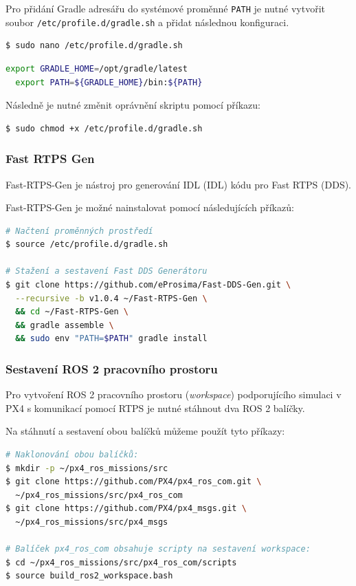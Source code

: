 Pro přidání Gradle adresářu do systémové proměnné \texttt{PATH} je nutné vytvořit soubor \texttt{/etc/profile.d/gradle.sh} a přidat následnou konfiguraci.

\begin{lstlisting}[language=bash]
$ sudo nano /etc/profile.d/gradle.sh
\end{lstlisting}

\begin{lstlisting}[language=bash]
  export GRADLE_HOME=/opt/gradle/latest
  export PATH=${GRADLE_HOME}/bin:${PATH}
\end{lstlisting}

Následně je nutné změnit oprávnění skriptu pomocí příkazu:

\begin{lstlisting}[language=bash]
$ sudo chmod +x /etc/profile.d/gradle.sh
\end{lstlisting}

\subsubsection{Fast RTPS Gen}

Fast-RTPS-Gen je nástroj pro generování \acs{IDL} (\acl{IDL}) kódu pro Fast RTPS (\acs{DDS}).

Fast-RTPS-Gen je možné nainstalovat pomocí následujících příkazů:

\begin{lstlisting}[language=bash]
# Načtení proměnných prostředí
$ source /etc/profile.d/gradle.sh

# Stažení a sestavení Fast DDS Generátoru
$ git clone https://github.com/eProsima/Fast-DDS-Gen.git \
  --recursive -b v1.0.4 ~/Fast-RTPS-Gen \
  && cd ~/Fast-RTPS-Gen \
  && gradle assemble \
  && sudo env "PATH=$PATH" gradle install
\end{lstlisting}

\subsubsection{Sestavení ROS 2 pracovního prostoru}

Pro vytvoření ROS 2 pracovního prostoru (\textit{workspace}) podporujícího simulaci v PX4 s komunikací pomocí \acs{RTPS} je nutné stáhnout dva ROS 2 balíčky. \cite{PX4docs}

Na stáhnutí a sestavení obou balíčků můžeme použít tyto příkazy:

\begin{lstlisting}[language=bash]
# Naklonování obou balíčků:
$ mkdir -p ~/px4_ros_missions/src
$ git clone https://github.com/PX4/px4_ros_com.git \
  ~/px4_ros_missions/src/px4_ros_com
$ git clone https://github.com/PX4/px4_msgs.git \
  ~/px4_ros_missions/src/px4_msgs
  
# Balíček px4_ros_com obsahuje scripty na sestavení workspace:
$ cd ~/px4_ros_missions/src/px4_ros_com/scripts
$ source build_ros2_workspace.bash
\end{lstlisting}

